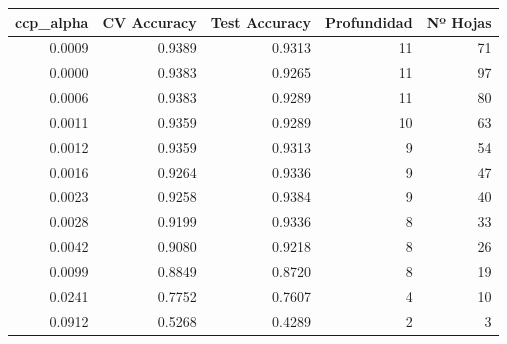 \begin{tabular}{rrrrr}
\toprule
ccp\_alpha & CV Accuracy & Test Accuracy & Profundidad & Nº Hojas \\
\midrule
0.0009 & 0.9389 & 0.9313 & 11 & 71 \\
0.0000 & 0.9383 & 0.9265 & 11 & 97 \\
0.0006 & 0.9383 & 0.9289 & 11 & 80 \\
0.0011 & 0.9359 & 0.9289 & 10 & 63 \\
0.0012 & 0.9359 & 0.9313 & 9 & 54 \\
0.0016 & 0.9264 & 0.9336 & 9 & 47 \\
0.0023 & 0.9258 & 0.9384 & 9 & 40 \\
0.0028 & 0.9199 & 0.9336 & 8 & 33 \\
0.0042 & 0.9080 & 0.9218 & 8 & 26 \\
0.0099 & 0.8849 & 0.8720 & 8 & 19 \\
0.0241 & 0.7752 & 0.7607 & 4 & 10 \\
0.0912 & 0.5268 & 0.4289 & 2 & 3 \\
\bottomrule
\end{tabular}
